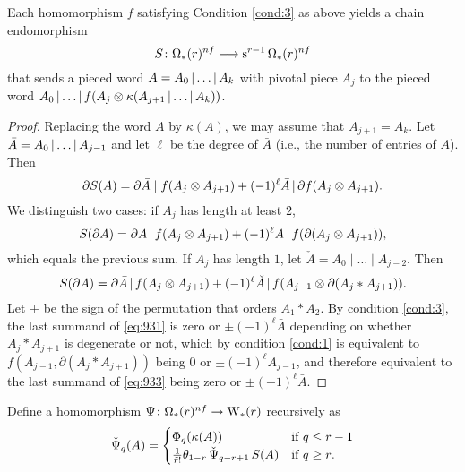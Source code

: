 \begin{theorem} Each homomorphism $f$ satisfying Condition \eqref{cond:3} as above yields a chain endomorphism
	\[
	S\colon \Omega_*(r)^{nf}\longrightarrow \operatorname{s}^{r-1}\Omega_*(r)^{nf}
	\]
	that sends a pieced word $A = A_0\operatorname{|} \ldots\operatorname{|} A_k$ with pivotal piece $A_j$ to the pieced word $ A_0\operatorname{|} \ldots\operatorname{|} f(A_j\otimes \kappa(A_{j+1}\operatorname{|} \ldots\operatorname{|} A_k))$.
\end{theorem}
\begin{proof}
	Replacing the word $A$ by $\kappa(A)$, we may assume that $A_{j+1} = A_k$. Let $\bar{A} = A_0\operatorname{|} \ldots\operatorname{|} A_{j-1}$ and let $\ell$ be the degree of $\bar{A}$ (i.e., the number of entries of $A$). Then %
	\begin{equation}\label{eq:931}
		\partial S(A) = \partial \bar{A}\mid f(A_{j}\otimes A_{j+1}) + (-1)^{\ell}\bar{A}\operatorname{|} \partial f(A_{j}\otimes A_{j+1}).
	\end{equation}
	We distinguish two cases: if $A_j$ has length at least $2$,
	\[S(\partial A) = \partial \bar{A}\operatorname{|} f(A_j\otimes A_{j+1}) + (-1)^{\ell}\bar{A}\operatorname{|} f(\partial (A_j\otimes A_{j+1})),\]
	which equals the previous sum. If $A_j$ has length $1$, let $\check{A} = A_0\mid \ldots\mid A_{j-2}$. Then
	\begin{equation}\label{eq:933}
		S(\partial A) = \partial \bar{A}\operatorname{|} f(A_j\otimes A_{j+1}) + (-1)^\ell \check{A}\operatorname{|} f(A_{j-1}\otimes \partial(A_j*A_{j+1})).
	\end{equation}
	Let $\pm$ be the sign of the permutation that orders $A_1*A_2$. By condition \eqref{cond:3}, the last summand of \eqref{eq:931} is zero or $\pm(-1)^\ell\bar{A}$ depending on whether $A_j*A_{j+1}$ is degenerate or not, which by condition \eqref{cond:1} is equivalent to $f(A_{j-1},\partial(A_j*A_{j+1}))$ being $0$ or $\pm(-1)^{\ell}A_{j-1}$, and therefore equivalent to the last summand of \eqref{eq:933} being zero or $\pm(-1)^{\ell}\bar{A}$.
\end{proof}


\begin{definition}
	Define a homomorphism $\Psi\colon \Omega_*(r)^{nf}\to \mathrm{W}_*(r)$ recursively as
	\[\operatorname{\check{\Psi}}_q(A) = \begin{cases} \Phi_q(\kappa(A)) & \text{if $q\leq r-1$} \\
		\frac{1}{\tilde{r}!}\theta_{1-r}\operatorname{\check{\Psi}}_{q-r+1}S(A) & \text{if $q\geq r$.}\end{cases}\]
\end{definition}

